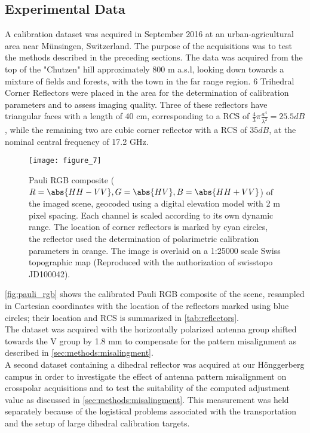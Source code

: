 \subsection{Experimental Data}\label{sec:methods:data}
A calibration dataset was acquired in September 2016 at an urban-agricultural area near M\"{u}nsingen, Switzerland. The purpose of the acquisitions was to test the methods described in the preceding sections. The data was acquired from the top of the "Chutzen" hill approximately 800 m a.s.l, looking down towards a mixture of fields and forests, with the town in the far range region. 6 Trihedral Corner Reflectors were placed in the area for the determination of calibration parameters and to assess imaging quality. Three of these reflectors have triangular faces with a length of 40 cm, corresponding to a RCS of $\frac{4}{3}\pi \frac{a^4}{\lambda^2}=25.5 dB$, while the remaining two are cubic corner reflector with a RCS of $35 dB$, at the nominal central frequency of 17.2 GHz.
	\begin{figure}
		\centering
		\texttt{[image: figure\_7]}
		\caption{Pauli RGB composite ($R=\abs{HH-VV},G=\abs{HV},B=\abs{HH+VV}$) of the imaged scene, geocoded using a digital elevation model with 2 m pixel spacing. Each channel is scaled according to its own dynamic range. The location of corner reflectors is marked by cyan circles, the reflector used the determination of polarimetric calibration parameters in orange. The image is overlaid on a 1:25000 scale Swiss topographic map (Reproduced with the authorization of swisstopo  JD100042).}
		\label{fig:pauli_rgb}
	\end{figure}
\autoref{fig:pauli_rgb} shows the calibrated Pauli RGB composite of the scene, resampled in Cartesian coordinates with the location of the reflectors marked using blue circles; their location and RCS is summarized in \autoref{tab:reflectors}.\\
The dataset was acquired with the horizontally polarized antenna group shifted towards the V group by 1.8 mm to compensate for the pattern misalignment as described in \autoref{sec:methods:misalingment}.\\
A second dataset containing a dihedral reflector was acquired at our H\"{o}nggerberg campus in order to investigate the effect of antenna pattern misalignment on crosspolar acquisitions and to test the suitability of the computed adjustment value as discussed in \autoref{sec:methods:misalingment}. This measurement was held separately because of the logistical problems associated with the transportation and the setup of large dihedral calibration targets.

